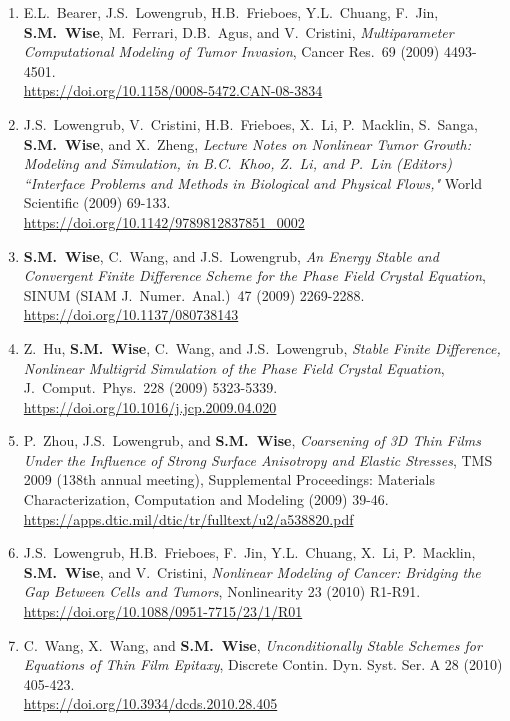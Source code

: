\documentclass[11pt]{letter}
\begin{document}
\begin{enumerate}
	\item
E.L.~Bearer, J.S.~Lowengrub, H.B.~Frieboes, Y.L.~Chuang, F.~Jin, \textbf{S.M.~Wise}, M.~Ferrari, D.B.~Agus, and V.~Cristini, {\sl Multiparameter Computational Modeling of Tumor Invasion}, Cancer Res.~69 (2009) 4493-4501.
	\\
\url{https://doi.org/10.1158/0008-5472.CAN-08-3834}

	\item
J.S.~Lowengrub, V.~Cristini, H.B.~Frieboes, X.~Li, P.~Macklin, S.~Sanga, \textbf{S.M.~Wise}, and X.~Zheng, {\sl Lecture Notes on Nonlinear Tumor Growth: Modeling and Simulation, in  B.C.~Khoo, Z.~Li, and P.~Lin (Editors) ``Interface Problems and Methods in Biological and Physical Flows,"} World Scientific (2009) 69-133.
	\\
\url{https://doi.org/10.1142/9789812837851_0002}

	\item
\textbf{S.M.~Wise}, C.~Wang, and J.S.~Lowengrub, {\sl An Energy Stable and Convergent Finite Difference Scheme for the Phase Field Crystal Equation}, SINUM (SIAM J.~Numer.~Anal.)~47 (2009) 2269-2288.
	\\
\url{https://doi.org/10.1137/080738143}

	\item
Z.~Hu, \textbf{S.M.~Wise}, C.~Wang, and J.S.~Lowengrub, {\sl Stable Finite Difference, Nonlinear Multigrid Simulation of the Phase Field Crystal Equation}, J.~Comput.~Phys.~228 (2009) 5323-5339.
	\\
\url{https://doi.org/10.1016/j.jcp.2009.04.020}

	\item
P.~Zhou, J.S.~Lowengrub, and \textbf{S.M.~Wise}, {\sl Coarsening of 3D Thin Films Under the Influence of Strong Surface Anisotropy and Elastic Stresses}, TMS 2009 (138th annual meeting), Supplemental Proceedings: Materials Characterization, Computation and Modeling (2009) 39-46.
	\\
\url{https://apps.dtic.mil/dtic/tr/fulltext/u2/a538820.pdf}

	\item
J.S.~Lowengrub, H.B.~Frieboes, F.~Jin, Y.L.~Chuang, X.~Li, P.~Macklin, \textbf{S.M.~Wise}, and V.~Cristini, {\sl Nonlinear Modeling of Cancer: Bridging the Gap Between Cells and Tumors}, Nonlinearity 23 (2010) R1-R91.
	\\
\url{https://doi.org/10.1088/0951-7715/23/1/R01}

	\item
C.~Wang, X.~Wang, and \textbf{S.M.~Wise}, {\sl Unconditionally Stable Schemes for Equations of Thin Film Epitaxy}, Discrete Contin. Dyn. Syst. Ser. A 28 (2010) 405-423.
	\\
\url{https://doi.org/10.3934/dcds.2010.28.405}


\end{enumerate}
\end{document}
